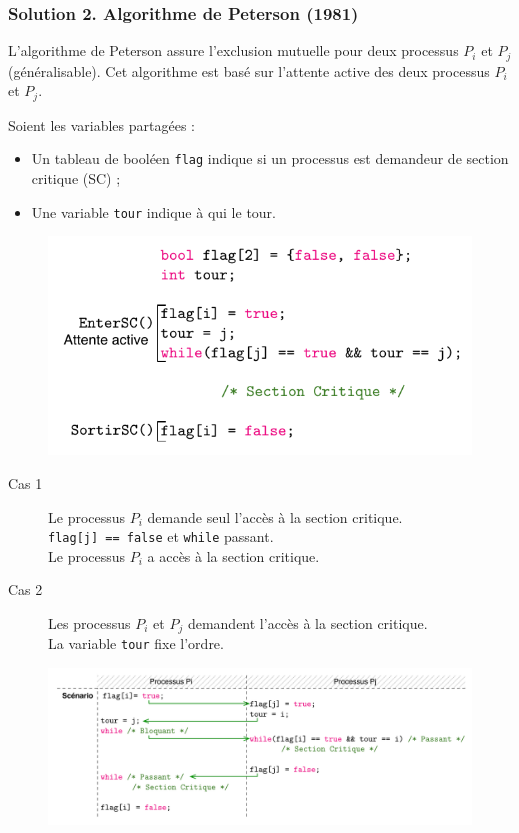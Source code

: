 \documentclass[11pt,english,french]{scrreprt}
\theoremstyle{remark}
\theoremstyle{definition}
\begin{document}
\subsubsection{Solution 2. Algorithme de Peterson (1981)}
L'algorithme de Peterson assure l'exclusion mutuelle pour deux processus $P_i$ et $P_j$ (généralisable). Cet algorithme est basé sur l'attente active des deux processus $P_i$ et $P_j$.

Soient les variables partagées : 
\begin{itemize}
\item Un tableau de booléen \lstinline!flag! indique si un processus est demandeur de section critique (SC) ;
\item Une variable \lstinline!tour! indique à qui le tour.
\end{itemize}

\begin{figure}[h!]
	\center
	\includegraphics[scale=.85]{img/SC-peterson}
\end{figure}

\begin{description}
	\item[Cas 1] Le processus $P_i$ demande seul l'accès à la section critique.\\
	\lstinline!flag[j] == false! et \lstinline!while! passant.\\
	Le processus $P_i$ a accès à la section critique.
	\item[Cas 2] Les processus $P_i$ et $P_j$ demandent l'accès à la section critique.\\
	La variable \lstinline!tour! fixe l'ordre.
\end{description}
\clearpage
\begin{figure}[h!]
	\center
	\includegraphics[scale=.85]{img/SC-peterson-scenario}
\end{figure}
\end{document}
